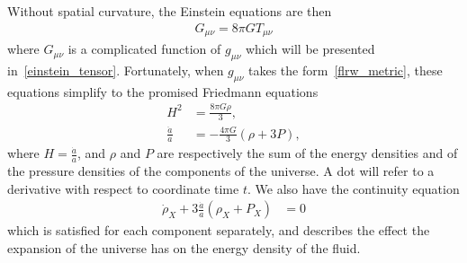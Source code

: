     Without spatial curvature, the Einstein equations are then
    \begin{align}\label{einstein_equations}
        G_{\mu\nu} = 8\pi G T_{\mu\nu}
    \end{align}
    where $G_{\mu\nu}$ is a complicated function of $g_{\mu\nu}$ which
    will be presented in~\eqref{einstein_tensor}.
    Fortunately, when $g_{\mu\nu}$ takes the form~\eqref{flrw_metric},
    these equations simplify to the promised Friedmann equations
    \begin{align}\label{friedmann_1}
        H^2 &= \frac{8\pi G \rho}{3},\\
        \frac{\ddot{a}}{a} &= -\frac{4\pi G}{3}\left(\rho+3P\right),
    \end{align}
    where $H=\frac{\dot{a}}{a}$, and $\rho$ and $P$ are respectively the sum of the
    energy densities and of the pressure densities of the
    components of the universe.
    A dot will refer to a derivative with respect to coordinate time $t$.
    We also have the continuity equation
    \begin{align}\label{continuity_equation}
        \dot{\rho}_X + 3\frac{\dot{a}}{a}\left(\rho_X+P_X\right) &= 0
    \end{align}
    which is satisfied for each component separately, and describes
    the effect the expansion of the universe has on the energy density of the fluid.

